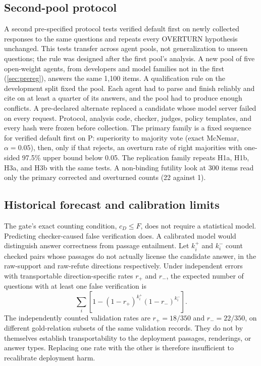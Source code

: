 \subsection{Second-pool protocol}

A second pre-specified protocol tests verified default first on newly collected responses to the same questions and repeats every OVERTURN hypothesis unchanged. This tests transfer across agent pools, not generalization to unseen questions; the rule was designed after the first pool's analysis. A new pool of five open-weight agents, from developers and model families not in the first (\cref{sec:prereg}), answers the same 1,100 items. A qualification rule on the development split fixed the pool. Each agent had to parse and finish reliably and cite on at least a quarter of its answers, and the pool had to produce enough conflicts. A pre-declared alternate replaced a candidate whose model server failed on every request. Protocol, analysis code, checker, judges, policy templates, and every hash were frozen before collection. The primary family is a fixed sequence for verified default first on P: superiority to majority vote (exact McNemar, $\alpha = 0.05$), then, only if that rejects, an overturn rate of right majorities with one-sided 97.5\% upper bound below 0.05. The replication family repeats H1a, H1b, H3a, and H3b with the same tests. A non-binding futility look at 300 items read only the primary corrected and overturned counts (22 against 1).

\subsection{Historical forecast and calibration limits}
\label{sec:forecast}

The gate's exact counting condition, $c_D\leq F$, does not require a statistical model. Predicting checker-caused false verification does. A calibrated model would distinguish answer correctness from passage entailment. Let $k_i^+$ and $k_i^-$ count checked pairs whose passages do not actually license the candidate answer, in the raw-support and raw-refute directions respectively. Under independent errors with transportable direction-specific rates $r_+$ and $r_-$, the expected number of questions with at least one false verification is
\[
  \sum_i \left[1-(1-r_+)^{k_i^+}(1-r_-)^{k_i^-}\right].
\]
The independently counted validation rates are $r_+=18/350$ and $r_-=22/350$, on different gold-relation subsets of the same validation records. They do not by themselves establish transportability to the deployment passages, renderings, or answer types. Replacing one rate with the other is therefore insufficient to recalibrate deployment harm.

